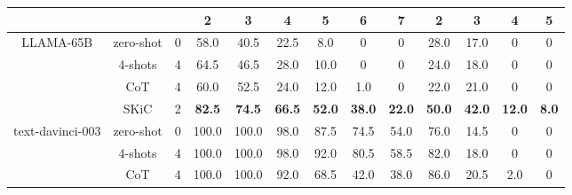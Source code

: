 \documentclass{article} \usepackage{arxiv}
\begin{document}
\begin{table}[t]
{\begin{tabular}{c|c|c|cc|cccc||cc|cc}
 & & &\multicolumn{1}{c}{\textbf{2}} & \multicolumn{1}{c|}{\textbf{3}} & \textbf{4}   & \textbf{5}   & \textbf{6}   & \textbf{7} &\multicolumn{1}{c}{\textbf{2}} & \multicolumn{1}{c|}{\textbf{3}} & \textbf{4}   & \textbf{5} \\ \midrule \midrule
\multirow{4}{*}{LLAMA-65B} & zero-shot    &0              & 58.0                             & 40.5                             & 22.5           & 8.0            & 0            & 0            & 28.0                             & 17.0                             & 0                              & 0                              \\
                           & 4-shots  &4            & 64.5                             & 46.5                             & 28.0           & 10.0            & 0            & 0            & 24.0                             & 18.0                             & 0                              & 0                              \\
                           & CoT   &4             & 60.0                             & 52.5                             & 24.0           & 12.0           & 1.0            & 0           & 22.0                             & 21.0                             & 0                              & 0                              \\
                           & SKiC  &2     & \textbf{82.5}                    & \textbf{74.5}                    & \textbf{66.5}  & \textbf{52.0}  & \textbf{38.0}  & \textbf{22.0}   & \textbf{50.0}                    & \textbf{42.0}                    & \textbf{12.0}                    & \textbf{8.0}                     \\   \midrule
\multirow{5}{*}{text-davinci-003}  & zero-shot  &0                & 100.0                            & 100.0                            & 98.0           & 87.5           & 74.5           & 54.0           & 76.0                             & 14.5                             & 0                              & 0                              \\
                           & 4-shots &4               & 100.0                            & 100.0                            & 98.0           & 92.0           & 80.5           & 58.5           & 82.0                             & 18.0                             & 0                              & 0                              \\
                           & CoT    &4               & 100.0                            & 100.0                            & 92.0           & 68.5           & 42.0           & 38.0            & 86.0                             & 20.5                             & 2.0                              & 0                              \\ 

\end{tabular}}
\end{table}
\end{document}

